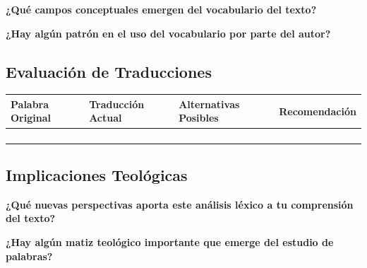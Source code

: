 \documentclass[11pt,a4paper]{article}
\begin{document}
\textbf{¿Qué campos conceptuales emergen del vocabulario del texto?}
\vspace{2cm}

\textbf{¿Hay algún patrón en el uso del vocabulario por parte del autor?}
\vspace{2cm}

\subsection{Evaluación de Traducciones}

\begin{tabularx}{\textwidth}{|L{3cm}|L{3cm}|L{3.5cm}|X|}
\hline
\textbf{Palabra Original} & \textbf{Traducción Actual} & \textbf{Alternativas Posibles} & \textbf{Recomendación} \\
\hline
\vspace{1.5cm} & \vspace{1.5cm} & \vspace{1.5cm} & \vspace{1.5cm} \\
\hline
\vspace{1.5cm} & \vspace{1.5cm} & \vspace{1.5cm} & \vspace{1.5cm} \\
\hline
\vspace{1.5cm} & \vspace{1.5cm} & \vspace{1.5cm} & \vspace{1.5cm} \\
\hline
\vspace{1.5cm} & \vspace{1.5cm} & \vspace{1.5cm} & \vspace{1.5cm} \\
\hline
\end{tabularx}

\subsection{Implicaciones Teológicas}

\textbf{¿Qué nuevas perspectivas aporta este análisis léxico a tu comprensión del texto?}
\vspace{3cm}

\textbf{¿Hay algún matiz teológico importante que emerge del estudio de palabras?}
\vspace{3cm}
\end{document}
